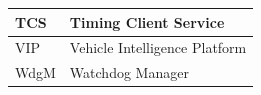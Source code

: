 \begin{longtable}{|l|l|}
\begin{minipage}{0.31\linewidth}\raggedright\vspace{.75ex}TCS\vspace{.75ex}\end{minipage} & \begin{minipage}{0.63\linewidth}\raggedright\vspace{.75ex}Timing Client Service\vspace{.75ex}\end{minipage}\\\hline
\begin{minipage}{0.31\linewidth}\raggedright\vspace{.75ex}VIP\vspace{.75ex}\end{minipage} & \begin{minipage}{0.63\linewidth}\raggedright\vspace{.75ex}Vehicle Intelligence Platform\vspace{.75ex}\end{minipage}\\\hline
\begin{minipage}{0.31\linewidth}\raggedright\vspace{.75ex}WdgM\vspace{.75ex}\end{minipage} & \begin{minipage}{0.63\linewidth}\raggedright\vspace{.75ex} Watchdog Manager\vspace{.75ex}\end{minipage}\\\hline
\end{longtable}